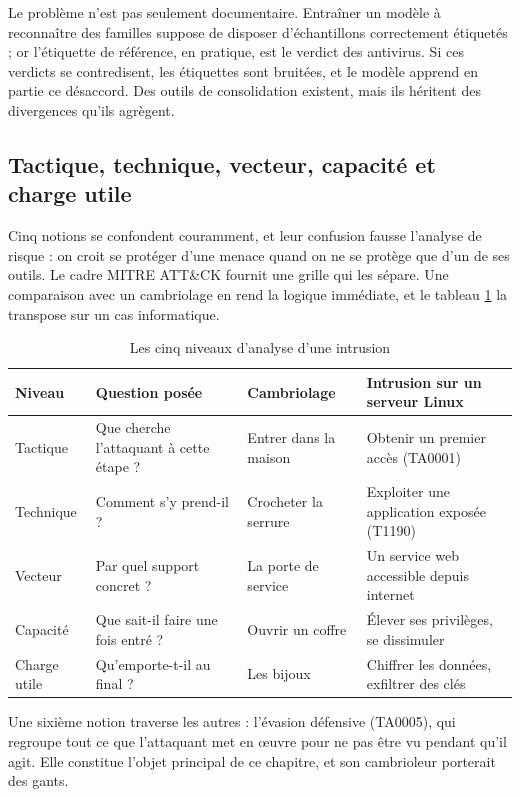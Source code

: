 Le problème n'est pas seulement documentaire. Entraîner un modèle à reconnaître des familles suppose de disposer d'échantillons correctement étiquetés ; or l'étiquette de référence, en pratique, est le verdict des antivirus. Si ces verdicts se contredisent, les étiquettes sont bruitées, et le modèle apprend en partie ce désaccord. Des outils de consolidation existent, mais ils héritent des divergences qu'ils agrègent.

\subsection{Tactique, technique, vecteur, capacité et charge utile}

Cinq notions se confondent couramment, et leur confusion fausse l'analyse de risque : on croit se protéger d'une menace quand on ne se protège que d'un de ses outils. Le cadre MITRE ATT\&CK \cite{attack} fournit une grille qui les sépare. Une comparaison avec un cambriolage en rend la logique immédiate, et le tableau \ref{tab:attack} la transpose sur un cas informatique.

\begin{table}[h!]
\centering
\caption{Les cinq niveaux d'analyse d'une intrusion}
\label{tab:attack}
\begin{tabular}{|l|p{3.6cm}|p{3.4cm}|p{4.2cm}|}
\hline
Niveau & Question posée & Cambriolage & Intrusion sur un serveur Linux \\
\hline
Tactique & Que cherche l'attaquant à cette étape ? & Entrer dans la maison & Obtenir un premier accès (TA0001) \\
\hline
Technique & Comment s'y prend-il ? & Crocheter la serrure & Exploiter une application exposée (T1190) \\
\hline
Vecteur & Par quel support concret ? & La porte de service & Un service web accessible depuis internet \\
\hline
Capacité & Que sait-il faire une fois entré ? & Ouvrir un coffre & Élever ses privilèges, se dissimuler \\
\hline
Charge utile & Qu'emporte-t-il au final ? & Les bijoux & Chiffrer les données, exfiltrer des clés \\
\hline
\end{tabular}
\end{table}

Une sixième notion traverse les autres : l'évasion défensive (TA0005), qui regroupe tout ce que l'attaquant met en \oe uvre pour ne pas être vu pendant qu'il agit. Elle constitue l'objet principal de ce chapitre, et son cambrioleur porterait des gants.

